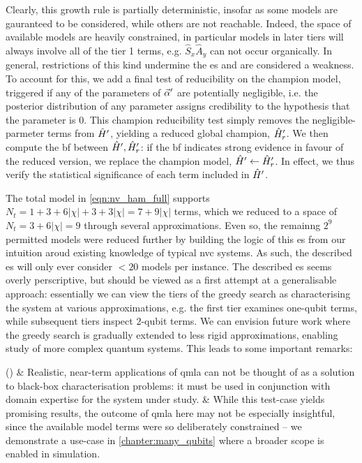 Clearly, this growth rule is partially deterministic, insofar as some models are gauranteed to be considered, 
    while others are not reachable.
Indeed, the space of available models are heavily constrained, in particular models in later tiers will 
    always involve all of the tier 1 terms, e.g. $\hat{S}_{x}\hat{A}_{y}$ can not occur organically. 
In general, restrictions of this kind undermine the \gls{es} and are considered a weakness.
To account for this, we add a final test of reducibility on the \gls{champion model}, 
    triggered if any of the parameters of $\vec{\alpha}^{\prime}$ are potentially negligible, 
    i.e. the posterior distribution of any parameter assigns credibility to the hypothesis that the parameter is 0.
This champion reducibility test simply removes the negligible-parmeter terms from $\hat{H}^{\prime}$, 
    yielding a reduced global champion, $\hat{H}^{\prime}_r$.
We then compute the \gls{bf} between $\hat{H}^{\prime}, \hat{H}^{\prime}_r$: 
    if the \gls{bf} indicates strong evidence in favour of the reduced version, 
    we replace the \gls{champion model}, $\hat{H}^{\prime} \gets \hat{H}^{\prime}_r$. 
In effect, we thus verify the statistical significance of each term included in $\hat{H}^{\prime}$. 
\par 

The total model in \cref{eqn:nv_ham_full} supports $N_t = 1 + 3 + 6 | \chi | + 3 + 3 |\chi| = 7 + 9|\chi| $ terms, 
    which we reduced to a space of $N_t=3 + 6 |\chi| = 9$ through several approximations\footnotemark.
Even so, the remainng $2^9$ permitted models were reduced further by building the logic of this \gls{es} 
    from our intuition aroud existing knowledge of typical \gls{nvc} systems.
As such, the described \gls{es} will only ever consider $<20$ models per instance. 
The described \gls{es} seems overly perscriptive, 
    but should be viewed as a first attempt at a generalisable approach: 
    essentially we can view the tiers of the greedy search as characterising the system 
    at various approximations, 
    e.g. the first tier examines one-qubit terms, while subsequent tiers inspect $2$-qubit terms. 
We can envision future work where the greedy search is gradually extended to less rigid approximations, 
    enabling study of more complex quantum systems.     
This leads to some important remarks:

\begin{easylist}[enumerate]
    \ListProperties()
    & Realistic, near-term applications of \gls{qmla} can not be thought of as a solution to black-box characterisation problems: 
        it must be used in conjunction with domain expertise for the system under study.
    & While this test-case yields promising results, the outcome of \gls{qmla} here may not be especially insightful, 
        since the available model terms were so deliberately constrained -- we demonstrate a use-case in \cref{chapter:many_qubits} 
        where a broader scope is enabled in simulation.    
\end{easylist}   
\par 

